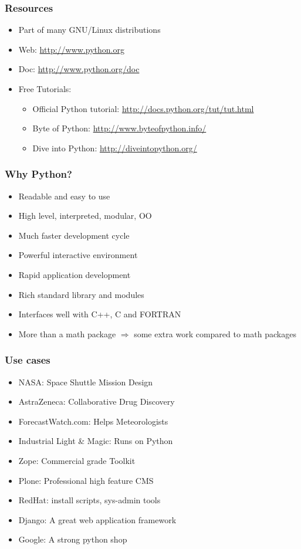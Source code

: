\documentclass[14pt,compress]{beamer}
\begin{document}
\begin{frame}
  \frametitle{Resources}
  \begin{itemize}
  \item Part of many GNU/Linux distributions
  \item Web: \url{http://www.python.org}
  \item Doc: \url{http://www.python.org/doc}
  \item Free Tutorials:
    \begin{itemize}
    \item Official Python tutorial: \url{http://docs.python.org/tut/tut.html}
    \item Byte of Python: \url{http://www.byteofpython.info/}
    \item Dive into Python: \url{http://diveintopython.org/}
    \end{itemize}
  \end{itemize}
\end{frame}

\begin{frame}
  \frametitle{Why Python?}
  \begin{itemize}
  \item Readable and easy to use
  \item High level, interpreted, modular, OO
  \item Much faster development cycle
  \item Powerful interactive environment
  \item Rapid application development
  \item Rich standard library and modules
  \item Interfaces well with C++, C and FORTRAN
  \item \alert{More than a math package $\Rightarrow$ some extra work compared to math packages}
  \end{itemize}
\end{frame}

\begin{frame}
  \frametitle{Use cases}
  \begin{itemize}
  \item NASA: Space Shuttle Mission Design
  \item AstraZeneca: Collaborative Drug Discovery
  \item ForecastWatch.com: Helps Meteorologists
  \item Industrial Light \& Magic: Runs on Python
  \item Zope: Commercial grade Toolkit
  \item Plone: Professional high feature CMS
  \item RedHat: install scripts, sys-admin tools
  \item Django: A great web application framework
  \item Google: A strong python shop
  \end{itemize}
\end{frame}
\end{document}
